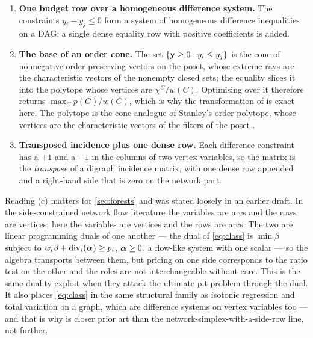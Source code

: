 \begin{enumerate}[label=(\alph*),leftmargin=*]
\item \textbf{One budget row over a homogeneous difference system.} The
      constraints $y_i - y_j \le 0$ form a system of homogeneous difference
      inequalities on a DAG; a single dense equality row with positive
      coefficients is added.
\item \textbf{The base of an order cone.} The set $\{\mathbf{y} \ge 0 : y_i \le y_j\}$ is
      the cone of nonnegative order-preserving vectors on the poset, whose
      extreme rays are the characteristic vectors of the nonempty closed sets;
      the equality slices it into the polytope whose vertices are
      $\chi^C / w(C)$. Optimising over it therefore returns
      $\max_C p(C)/w(C)$, which is why the transformation of
      \citet{CharnesCooper1962} is exact here. The polytope is the cone analogue
      of Stanley's order polytope, whose vertices are the characteristic vectors
      of the filters of the poset \citep{Stanley1986}.
\item \textbf{Transposed incidence plus one dense row.} Each difference
      constraint has a $+1$ and a $-1$ in the columns of two vertex variables, so
      the matrix is the \emph{transpose} of a digraph incidence matrix, with one
      dense row appended and a right-hand side that is zero on the network part.
\end{enumerate}

Reading (c) matters for \cref{sec:forests} and was stated loosely in an earlier
draft. In the side-constrained network flow literature the variables are arcs
and the rows are vertices; here the variables are vertices and the rows are arcs. The
two are linear programming duals of one another --- the dual of
\eqref{eq:class} is $\min \beta$ subject to $w_i\beta + \operatorname{div}_i(\boldsymbol{\alpha}) \ge p_i$,
$\boldsymbol{\alpha} \ge 0$, a flow-like system with one scalar --- so the algebra transports
between them, but pricing on one side corresponds to the ratio test on the other
and the roles are not interchangeable without care. This is the same duality
\citet{UnderwoodTolwinski1998} exploit when they attack the ultimate pit problem
through the dual. It also places \eqref{eq:class} in the same structural family
as isotonic regression and total variation on a graph, which are difference
systems on vertex variables too --- and that is why \citet{Yang2026} is closer
prior art than the network-simplex-with-a-side-row line, not further.

